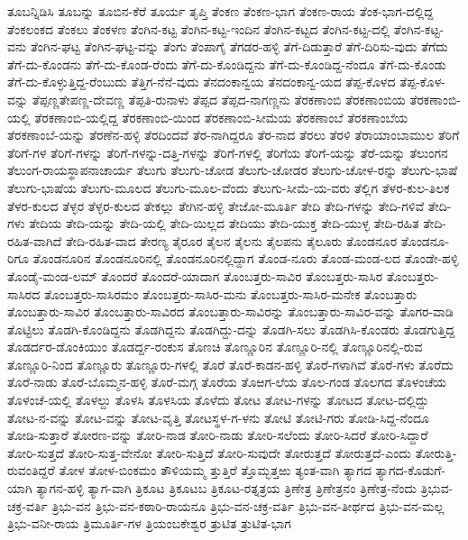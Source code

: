 {ತೂಬನ್ನಿಡಿಸಿ
ತೂಬನ್ನು
ತೂಬಿನ-ಕೆರೆ
ತೂರ್ಯ
ತೃಪ್ತಿ
ತೆಂಕಣ
ತೆಂಕಣ-ಭಾಗ
ತೆಂಕಣ-ರಾಯ
ತೆಂಕ-ಭಾಗ-ದಲ್ಲಿದ್ದ
ತೆಂಕಲಂಕದ
ತೆಂಕಲು
ತೆಂಕಳಣ
ತೆಂಗಿನ-ಕಟ್ಟ
ತೆಂಗಿನ-ಕಟ್ಟ-ಇಂದಿನ
ತೆಂಗಿನ-ಕಟ್ಟದ
ತೆಂಗಿನ-ಕಟ್ಟ-ದಲ್ಲಿ
ತೆಂಗಿನ-ಕಟ್ಟ-ವನು
ತೆಂಗಿನ-ಘಟ್ಟ
ತೆಂಗಿನ-ಘಟ್ಟ-ವನ್ನು
ತೆಂಗು
ತೆಂಪಾಗೈ
ತೆಗಡರ-ಹಳ್ಳಿ
ತೆಗೆ-ದಿಡುತ್ತಾರೆ
ತೆಗೆ-ದಿರಿಸು-ವುದು
ತೆಗೆದು
ತೆಗೆ-ದು-ಕೊಂಡನು
ತೆಗೆ-ದು-ಕೊಂಡ-ರೆಂದು
ತೆಗೆ-ದು-ಕೊಂಡಿದ್ದನು
ತೆಗೆ-ದು-ಕೊಂಡಿದ್ದ-ನೆಂದೂ
ತೆಗೆ-ದು-ಕೊಂಡು
ತೆಗೆ-ದು-ಕೊಳ್ಳುತ್ತಿದ್ದ-ರೆಂಬುದು
ತೆತ್ತಿಗ-ನೆನೆ-ವುದು
ತೆನದಂಕಾನ್ವಯ
ತೆನದಂಕಾನ್ವ-ಯದ
ತೆಪ್ಪ-ಕೊಳದ
ತೆಪ್ಪ-ಕೊಳ-ವನ್ನು
ತೆಪ್ಪಣ್ಣತೇಪಣ್ಣ-ದೇವಣ್ಣ
ತೆಪ್ಪತಿ-ರುನಾಳು
ತೆಪ್ಪದ
ತೆಪ್ಪದ-ನಾಗಣ್ಣನು
ತೆರಕಣಾಂಬಿ
ತೆರಕಣಾಂಬಿಯ
ತೆರಕಣಾಂಬಿ-ಯಲ್ಲಿ
ತೆರಕಣಾಂಬಿ-ಯಲ್ಲಿದ್ದ
ತೆರಕಣಾಂಬಿ-ಯಿಂದ
ತೆರಕಣಾಂಬಿ-ಸೀಮೆಯ
ತೆರಕಣಾಂಬೆ
ತೆರಕಣಾಂಬೆಯ
ತೆರಕಣಾಂಬೆ-ಯನ್ನು
ತೆರಣೆನ-ಹಳ್ಳಿ
ತೆರದಿಂದವೆ
ತೆರ-ನಾಗಿದ್ದರೂ
ತೆರ-ನಾದ
ತೆರಲು
ತೆರಳಿ
ತೆರಾಯಾಂಬಾಮುಲ
ತೆರಿಗೆ
ತೆರಿಗೆ-ಗಳ
ತೆರಿಗೆ-ಗಳನ್ನು
ತೆರಿಗೆ-ಗಳನ್ನು-ದತ್ತಿ-ಗಳನ್ನು
ತೆರಿಗೆ-ಗಳಲ್ಲಿ
ತೆರಿಗೆಯ
ತೆರಿಗೆ-ಯನ್ನು
ತೆರೆ-ಯನ್ನು
ತೆಲುಂಗನ
ತೆಲುಂಗ-ರಾಯಸ್ಥಾಪನಾಚಾರ್ಯ
ತೆಲುಗು
ತೆಲುಗು-ಚೋಡ
ತೆಲುಗು-ಚೋಡರ
ತೆಲುಗು-ಚೋಳ-ರನ್ನು
ತೆಲುಗು-ಭಾಷೆ
ತೆಲುಗು-ಭಾಷೆಯ
ತೆಲುಗು-ಮೂಲದ
ತೆಲುಗು-ಮೂಲ-ವೆಂದು
ತೆಲುಗು-ಸೀಮೆ-ಯ-ವರು
ತೆಲ್ಲಿಗ
ತೆಳರ-ಕುಲ-ತಿಲಕ
ತೆಳರ-ಕುಲದ
ತೆಳ್ಳರ
ತೆಳ್ಳರ-ಕುಲದ
ತೇಕಲ್ಲು
ತೇಗಿನ-ಹಳ್ಳಿ
ತೇಜೋ-ಮೂರ್ತಿ
ತೇದಿ
ತೇದಿ-ಗಳನ್ನು
ತೇದಿ-ಗಳಿವೆ
ತೇದಿ-ಗಳು
ತೇದಿಯ
ತೇದಿ-ಯನ್ನು
ತೇದಿ-ಯಲ್ಲಿ
ತೇದಿ-ಯಿಲ್ಲದ
ತೇದಿಯು
ತೇದಿ-ಯುಕ್ತ
ತೇದಿ-ಯುಳ್ಳ
ತೇದಿ-ರಹಿತ
ತೇದಿ-ರಹಿತ-ವಾಗಿದೆ
ತೇದಿ-ರಹಿತ-ವಾದ
ತೇರಣ್ಯ
ತೈರೂರ
ತೈಲನ
ತೈಲನು
ತೈಲಪನು
ತೈಲೂರು
ತೊಂಡನೂರ
ತೊಂಡನೂ-ರಿಗೂ
ತೊಂಡನೂರಿನ
ತೊಂಡನೂರಿನಲ್ಲಿ
ತೊಂಡನೂರಿನಲ್ಲಿದ್ದಾಗ
ತೊಂಡ-ನೂರು
ತೊಂಡ-ಮಂಡ-ಲದ
ತೊಂಡೇ-ಹಳ್ಳಿ
ತೊಂಡೈ-ಮಂಡ-ಲಮ್
ತೊಂದರೆ
ತೊಂದರೆ-ಯಾದಾಗ
ತೊಂಬತ್ತರು-ಸಾವಿರ
ತೊಂಬತ್ತರು-ಸಾಸಿರ
ತೊಂಬತ್ತರು-ಸಾಸಿರದ
ತೊಂಬತ್ತರು-ಸಾಸಿರಮಂ
ತೊಂಬತ್ತರು-ಸಾಸಿರ-ಮನು
ತೊಂಬತ್ತರು-ಸಾಸಿರ-ಮನೇಕ
ತೊಂಬತ್ತಾರು
ತೊಂಬತ್ತಾರು-ಸಾವಿರ
ತೊಂಬತ್ತಾರು-ಸಾವಿರದ
ತೊಂಬತ್ತಾರು-ಸಾವಿರನ್ನು
ತೊಂಬತ್ತಾರು-ಸಾವಿರ-ವನ್ನು
ತೊಗರ-ವಾಡಿ
ತೊಟ್ಟಿಲು
ತೊಡಗಿ-ಕೊಂಡಿದ್ದನು
ತೊಡಗಿದ್ದನು
ತೊಡಗಿದ್ದು-ದನ್ನು
ತೊಡಗಿ-ಸಲು
ತೊಡಗಿಸಿ-ಕೊಂಡರು
ತೊಡಗುತ್ತಿದ್ದ
ತೊಡರ್ದರ-ಡೊಂಕಿಯುಂ
ತೊಡರ್ದ್ದ-ರಂಕುಸ
ತೊಣಚಿ
ತೊಣ್ಣೂರಿನ
ತೊಣ್ಣೂರಿ-ನಲ್ಲಿ
ತೊಣ್ಣೂರಿನಲ್ಲಿ-ರುವ
ತೊಣ್ಣೂರಿ-ನಿಂದ
ತೊಣ್ಣೂರು
ತೊಣ್ಣೂರು-ಗಳಲ್ಲಿ
ತೊರೆ
ತೊರೆ-ಕಾಡನ-ಹಳ್ಳಿ
ತೊರೆ-ಗಳಾಗಿವೆ
ತೊರೆ-ಗಳು
ತೊರೆದು
ತೊರೆ-ನಾಡು
ತೊರೆ-ಬೊಮ್ಮನ-ಹಳ್ಳಿ
ತೊರೆ-ಮಗ್ಗ
ತೊರೆಯ
ತೊಱಗ-ಲೆಯ
ತೊಲ-ಗಂಡ
ತೊಲಗದ
ತೊಳಂಚೆಯ
ತೊಳಂಚೆ-ಯಲ್ಲಿ
ತೊಳಲ್ದು
ತೊಳಸಿ
ತೊಳಸಿಯ
ತೊಳೆದು
ತೋಟ
ತೋಟ-ಗಳನ್ನು
ತೋಟದ
ತೋಟ-ದಲ್ಲಿದ್ದು
ತೋಟ-ನ-ವನ್ನು
ತೋಟ-ವನ್ನು
ತೋಟ-ವೃತ್ತಿ
ತೋಟಸ್ಥಳ-ಗ-ಳನು
ತೋಟಿ
ತೋಟಿ-ಗರು
ತೋಡಿ-ಸಿದ್ದ-ನೆಂದೂ
ತೋಡಿ-ಸುತ್ತಾರೆ
ತೋರಣ-ವನ್ನು
ತೋರಿ-ನಾಡ
ತೋರಿ-ನಾಡು
ತೋರಿ-ಸಲೆಂದು
ತೋರಿ-ಸಿದರೆ
ತೋರಿ-ಸಿದ್ದಾರೆ
ತೋರಿ-ಸುತ್ತದೆ
ತೋರಿ-ಸುತ್ತ-ವೇನೋ
ತೋರಿ-ಸುತ್ತಿದೆ
ತೋರಿ-ಸುವುದೇ
ತೋರುತ್ತದೆ
ತೋರುತ್ತದೆ-ಎಂದು
ತೋರುತ್ತಿ-ರುವಂತಿದ್ದರೆ
ತೋಳ
ತೋಳ-ಬಿಂಕಮಂ
ತೌಳಿಯಮ್ಮ
ತ್ತುತ್ತಿರೆ
ತ್ತೊಮ್ಭತ್ತಱು
ತ್ಯಂತ-ವಾಗಿ
ತ್ಯಾಗದ
ತ್ಯಾಗದ-ಕೊಡುಗೆ-ಯಾಗಿ
ತ್ಯಾಗನ-ಹಳ್ಳಿ
ತ್ಯಾಗ-ವಾಗಿ
ತ್ರಿಕೂಟ
ತ್ರಿಕೂಟಬ
ತ್ರಿಕೂಟ-ರತ್ನತ್ರಯ
ತ್ರಿಣೇತ್ರ
ತ್ರಿಣೇತ್ರನಂ
ತ್ರಿಣೇತ್ರ-ನೆಂದು
ತ್ರಿಭುವ-ಚಕ್ರ-ವರ್ತಿ
ತ್ರಿಭು-ವನ
ತ್ರಿಭು-ವನ-ಕಠಾರಿ-ರಾಯನೂ
ತ್ರಿಭು-ವನ-ಚಕ್ರ-ವರ್ತಿ
ತ್ರಿಭು-ವನ-ತೀರ್ಥದ
ತ್ರಿಭು-ವನ-ಮಲ್ಲ
ತ್ರಿಭು-ವನೀ-ರಾಯ
ತ್ರಿಮೂರ್ತಿ-ಗಳ
ತ್ರಿಯಂಬಕೇಶ್ವರ
ತ್ರುಟಿತ
ತ್ರುಟಿತ-ಭಾಗ
}
